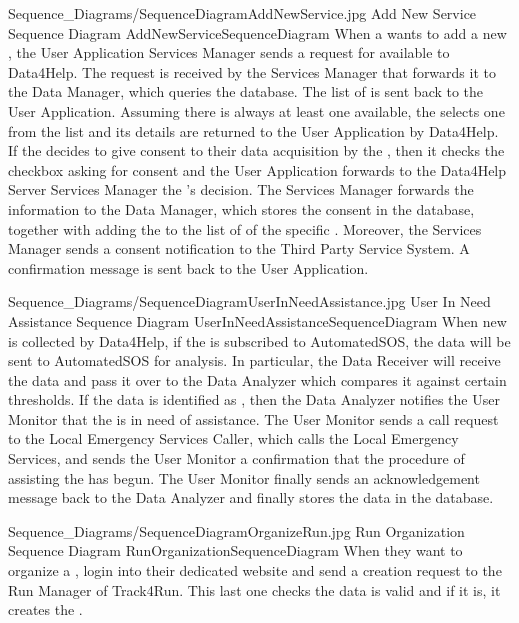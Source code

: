 \documentclass[../../DD.tex]{subfiles}
\begin{document}
	\image {13cm} {Sequence_Diagrams/SequenceDiagramAddNewService.jpg} {Add New Service Sequence Diagram} {AddNewServiceSequenceDiagram}
	When a  wants to add a new , the User Application Services Manager sends a request for available  to Data4Help. The request is received by the Services Manager that forwards it to the Data Manager, which queries the database. The list of  is sent back to the User Application. Assuming there is always at least one  available, the  selects one from the list and its details are returned to the User Application by Data4Help. If the  decides to give consent to their data acquisition by the , then it checks the checkbox asking for consent and the User Application forwards to the Data4Help Server Services Manager the 's decision. The Services Manager forwards the information to the Data Manager, which stores the consent in the database, together with adding the  to the list of  of the specific . Moreover, the Services Manager sends a consent notification to the Third Party Service System. A confirmation message is sent back to the User Application.



	\image {13cm} {Sequence_Diagrams/SequenceDiagramUserInNeedAssistance.jpg} {User In Need Assistance Sequence Diagram} {UserInNeedAssistanceSequenceDiagram}
	When new  is collected by Data4Help, if the  is subscribed to AutomatedSOS, the data will be sent to AutomatedSOS for analysis. In particular, the Data Receiver will receive the data and pass it over to the Data Analyzer which compares it against certain thresholds. If the data is identified as , then the Data Analyzer notifies the User Monitor that the  is in need of assistance. The User Monitor sends a call request to the Local Emergency Services Caller, which calls the Local Emergency Services, and sends the User Monitor a confirmation that the procedure of assisting the  has begun. The User Monitor finally sends an acknowledgement message back to the Data Analyzer and finally stores the  data in the database.
	

	\image {13cm} {Sequence_Diagrams/SequenceDiagramOrganizeRun.jpg} {Run Organization Sequence Diagram} {RunOrganizationSequenceDiagram}
	When they want to organize a ,  login into their dedicated website and send a  creation request to the Run Manager of Track4Run. This last one checks the  data is valid and if it is, it creates the .
\end{document}
